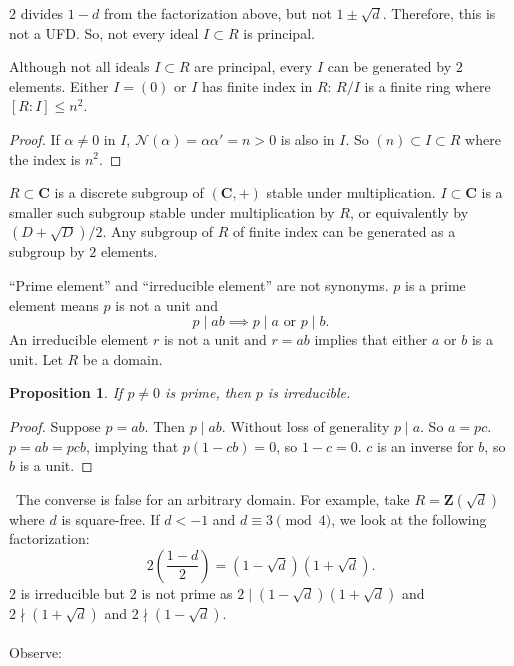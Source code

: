 \documentclass[11pt, oneside]{amsart}
\numberwithin{equation}{section}
\numberwithin{theorem}{section}
\newtheorem{proposition}[theorem]{Proposition}
\theoremstyle{definition}
\def\Z{\mathbf{Z}}
\def\C{\mathbf{C}}
\def\N{\mathcal{N}}
\begin{document}
{$2$ divides $1-d$ from the factorization above, but not $1\pm\sqrt d$. Therefore, this is not a UFD. So, not every ideal $I\subset R$ is principal. %

Although not all ideals $I\subset R$ are principal, every $I$ can be generated by $2$ elements. Either $I=(0)$ or $I$ has finite index in $R$: $R/I$ is a finite ring where $[R:I]\leqslant n^2$.
\begin{proof}
If $\alpha\neq 0$ in $I$, $\N(\alpha) = \alpha\alpha' = n>0$ is also in $I$. So $(n)\subset I\subset R$ where the index is $n^2$.
\end{proof}

$R\subset \C$ is a discrete subgroup of $(\C,+)$ stable under multiplication. $I\subset \C$ is a smaller such subgroup stable under multiplication by $R$, or equivalently by $(D+\sqrt D)/2$. Any subgroup of $R$ of finite index can be generated as a subgroup by $2$ elements. 

``Prime element'' and ``irreducible element'' are not synonyms. $p$ is a prime element means $p$ is not a unit and 
$$
p\mid ab\implies p\mid a\textrm{ or } p\mid b.
$$
An irreducible element $r$ is not a unit and $r=ab  $ implies that either $a$ or $b$ is a unit. Let $R$ be a domain. 
\begin{proposition}
If $p\neq 0$ is prime, then $p$ is irreducible.
\end{proposition}
\begin{proof}
Suppose $p=ab$. Then $p\mid ab$. Without loss of generality $p\mid a$. So $a=pc$. $p=ab=pcb$, implying that $p(1-cb) = 0$, so $1-c=0$. $c$ is an inverse for $b$, so $b$ is a unit.
\end{proof}
\noindent\hspace*{-23pt} \dbend\ The converse is false for an arbitrary domain. For example, take $R =\Z(\sqrt d)$ where $d$ is square-free. If $d<-1$ and $d\equiv 3\pmod 4$, we look at the following factorization:
$$
2\left(\frac{1-d}{2}\right) = (1-\sqrt d)(1+\sqrt d).
$$
$2$ is irreducible but $2$ is not prime as $2\mid (1-\sqrt d)(1+\sqrt d)$ and $2\nmid (1+\sqrt d)$ and $2\nmid (1-\sqrt d)$.\\\\

Observe:


}
\end{document}
